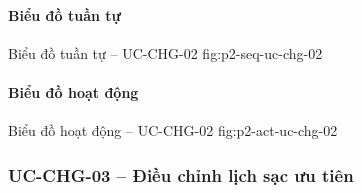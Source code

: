 \clearpage
\paragraph{Biểu đồ tuần tự}
  {Biểu đồ tuần tự -- UC-CHG-02}
  {fig:p2-seq-uc-chg-02}

\clearpage
\paragraph{Biểu đồ hoạt động}
  {Biểu đồ hoạt động -- UC-CHG-02}
  {fig:p2-act-uc-chg-02}

\clearpage

\subsubsection{UC-CHG-03 -- Điều chỉnh lịch sạc ưu tiên}


